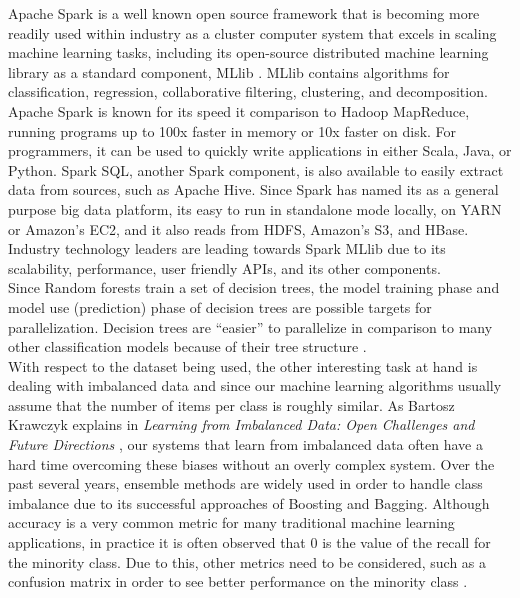 \documentclass{neu_handout}
\begin{document}
Apache Spark is a well known open source framework that is becoming more readily used within industry as a cluster computer system that excels in scaling machine learning tasks, including its open-source distributed machine learning library as a standard component, MLlib \cite{mllib}. MLlib contains algorithms for classification, regression, collaborative filtering, clustering, and decomposition. Apache Spark is known for its speed it comparison to Hadoop MapReduce, running programs up to 100x faster in memory or 10x faster on disk. For programmers, it can be used to quickly write applications in either Scala, Java, or Python. Spark SQL, another Spark component, is also available to easily extract data from sources, such as Apache Hive. Since Spark has named its as a general purpose big data platform, its easy to run in standalone mode locally, on YARN or Amazon's EC2, and it also reads from HDFS, Amazon's S3, and HBase. Industry technology leaders are leading towards Spark MLlib due to its scalability, performance, user friendly APIs, and its other components.\\

Since Random forests train a set of decision trees, the model training phase and model use (prediction) phase of decision trees are possible targets for parallelization. Decision trees are ``easier'' to parallelize in comparison to many other classification models because of their tree structure \cite{parallelrf}.\\

With respect to the dataset being used, the other interesting task at hand is dealing with imbalanced data and since our machine learning algorithms usually assume that the number of items per class is roughly similar. As Bartosz Krawczyk explains in \textit{Learning from Imbalanced Data: Open Challenges and Future Directions} \cite{Krawczyk}, our systems that learn from imbalanced data often have a hard time overcoming these biases without an overly complex system. Over the past several years, ensemble methods are widely used in order to handle class imbalance due to its successful approaches of Boosting and Bagging. Although accuracy is a very common metric for many traditional machine learning applications, in practice it is often observed that 0 is the value of the recall for the minority class. Due to this, other metrics need to be considered, such as a confusion matrix in order to see better performance on the minority class \cite{imbalance}.
\end{document}

